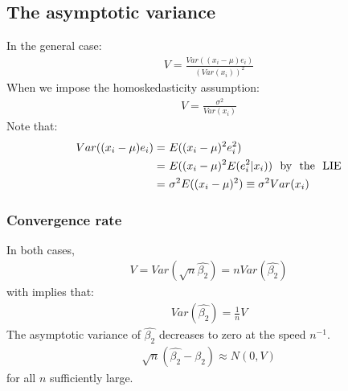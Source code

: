 \documentclass[a4paper,twoside,11pt]{article}
\begin{document}
\subsection{The asymptotic variance}
In the general case:
\begin{equation*}
\begin{aligned}
V = \frac{Var((x_i - \mu)e_i)}{(Var(x_i))^2}
\end{aligned}
\end{equation*}
When we impose the homoskedasticity assumption:
\begin{equation*}
\begin{aligned}
V = \frac{\sigma^2}{Var(x_i)}
\end{aligned}
\end{equation*}
Note that: 
\begin{equation*}
\begin{aligned}
Var((x_i - \mu)e_i) =& \ E((x_i - \mu)^2 e_i^2) \\
=& \ E((x_i - \mu)^2 E(e_i^2|x_i)) \ \ \textmd{by \ the \ LIE} \\
=& \ \sigma^2 E((x_i - \mu)^2 ) \equiv \sigma^2 Var(x_i)
\end{aligned}
\end{equation*}

\subsubsection{Convergence rate}
In both cases, 
\begin{equation*}
\begin{aligned}
V = Var(\sqrt{n} \hat{\beta_2}) = n Var(\hat{\beta_2})
\end{aligned}
\end{equation*}
with implies that:  
\begin{equation*}
\begin{aligned}
Var(\hat{\beta_2}) = \frac{1}{n}V
\end{aligned}
\end{equation*}
The asymptotic variance of $\hat{\beta_2}$ decreases to zero at the speed $n^{-1}$.
\begin{equation*}
\begin{aligned}
\sqrt{n} (\hat{\beta_2} - \beta_2 ) \approx N(0,V)
\end{aligned}
\end{equation*}
for all $n$ sufficiently large. 
\end{document}
